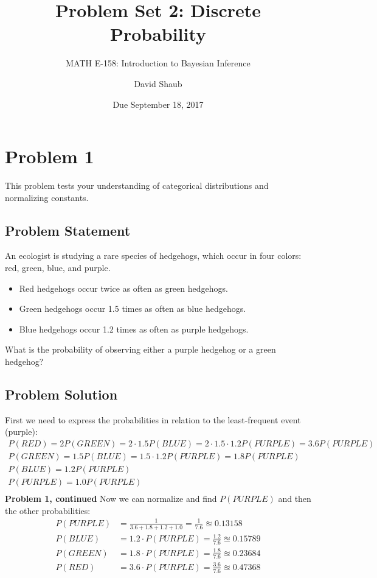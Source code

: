 \documentclass[12pt]{article}
\title{Problem Set 2: Discrete Probability}
\author{MATH E-158: Introduction to Bayesian Inference}
\author{David Shaub}
\date{Due September 18, 2017}
\theoremstyle{definition}
\begin{document}
\maketitle





\section*{Problem 1}

This problem tests your understanding of categorical distributions and normalizing constants.

\subsection*{Problem Statement}

An ecologist is studying a rare species of hedgehogs, which occur in four colors: red, green, blue, and purple.
\begin{itemize}
	\item Red hedgehogs occur twice as often as green hedgehogs.
	\item Green hedgehogs occur 1.5 times as often as blue hedgehogs.
	\item Blue hedgehogs occur 1.2 times as often as purple hedgehogs.
\end{itemize}
What is the probability of observing either a purple hedgehog or a green hedgehog?

\subsection*{Problem Solution}
First we need to express the probabilities in relation to the least-frequent event (purple):
\begin{align*}
P(RED) = 2P(GREEN)=2 \cdot 1.5P(BLUE) = 2 \cdot 1.5 \cdot 1.2P(PURPLE) = 3.6P(PURPLE)\\
P(GREEN) = 1.5P(BLUE) = 1.5 \cdot 1.2P(PURPLE) = 1.8P(PURPLE)\\
P(BLUE) = 1.2P(PURPLE)\\
P(PURPLE) = 1.0P(PURPLE)\\
\end{align*}
\newpage
\noindent
{\bf Problem 1, continued}
Now we can normalize and find $P(PURPLE)$ and then the other probabilities:
\begin{align*}
P(PURPLE) &= \frac{1}{3.6 + 1.8 + 1.2 + 1.0} = \frac{1}{7.6} \approxeq 0.13158\\
P(BLUE) &= 1.2 \cdot P(PURPLE) = \frac{1.2}{7.6} \approxeq 0.15789\\
P(GREEN) &= 1.8 \cdot P(PURPLE) = \frac{1.8}{7.6} \approxeq 0.23684\\
P(RED) &= 3.6 \cdot P(PURPLE) = \frac{3.6}{7.6} \approxeq 0.47368\\
\end{align*}
\end{document}
